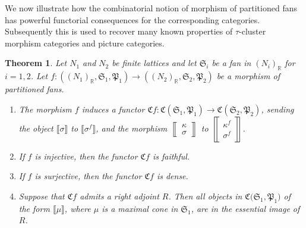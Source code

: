 \documentclass[10pt,twoside, a4paper,reqno]{amsart}
\newcommand{\eqclass}[1]{ \llbracket #1 \rrbracket }
\newcommand{\catof}{\mathfrak{C}}
\newcommand{\sqbinom}[2]{\left\llbracket \!\begin{smallmatrix} #1 \\ #2 \end{smallmatrix}\!\right\rrbracket}
\newcommand{\Pfrak}{\mathfrak{P}}
\newcommand{\R}{\mathbb{R}}
\newcommand{\Sfan}{\mathfrak{S}}
\newtheorem{theorem}{Theorem}[section]
\theoremstyle{definition}
\begin{document}
{We now illustrate how the combinatorial notion of morphism of partitioned fans has powerful functorial consequences for the corresponding categories. Subsequently this is used to recover many known properties of $\tau$-cluster morphism categories and picture categories.}

\begin{theorem}\label{thm:partmorphgivesfunctor} Let $N_1$ and $N_2$ be finite lattices and let $\Sfan_i$ be a fan in $(N_i)_\R$ for $i=1,2$. Let $f: ((N_1)_\R, \Sfan_1,\mathfrak{P}_1) \to ((N_2)_\R, \Sfan_2,\mathfrak{P}_2)$ be a morphism of partitioned fans.
    \begin{enumerate}
        \item\label{thm:partmorphgivesfunctor_welldef} The morphism $f$ induces a functor $\catof f\colon\catof(\Sfan_1,\mathfrak{P}_1)\xrightarrow{}\catof(\Sfan_2,\mathfrak{P}_2)$, sending the object $\eqclass{\sigma}$ to $\eqclass{\sigma^f}$, and the morphism $\sqbinom{{\kappa}}{\sigma}$ to $\sqbinom{{\kappa}^f}{\sigma^f}$. 
        \item\label{thm:partmorphgivesfunctor_inj} {If $f$ is injective, then the functor $\catof f$ is faithful.}
        \item\label{thm:partmorphgivesfunctor_surj} {If $f$ is surjective, then the functor $\catof f$ is dense.}
        \item\label{thm:partmorphgivesfunctor_adjbis_R2} Suppose that $\catof f$ admits a right adjoint $R$. Then all objects in $\catof{(}\Sfan_1{, \Pfrak_1)}$ of the form $\eqclass{\mu}$, where $\mu$ is a maximal cone in $\Sfan_1$, are in the essential image of $R$.
    \end{enumerate}
\end{theorem}
\end{document}
